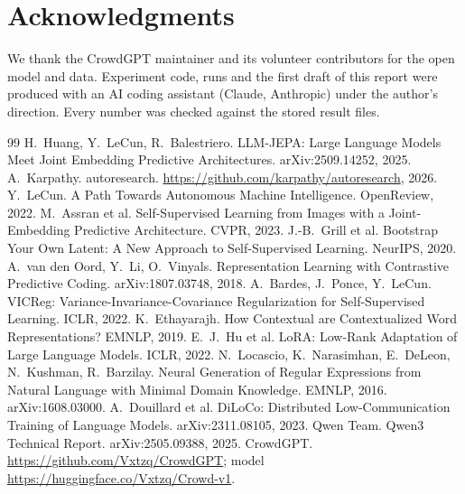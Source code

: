 \documentclass[11pt]{article}
\begin{document}
\section*{Acknowledgments}
We thank the CrowdGPT maintainer and its volunteer contributors for the open model and data. Experiment code, runs and
the first draft of this report were produced with an AI coding assistant (Claude, Anthropic) under the author's
direction. Every number was checked against the stored result files.

\begin{thebibliography}{99}
 H.~Huang, Y.~LeCun, R.~Balestriero. LLM-JEPA: Large Language Models Meet Joint Embedding
Predictive Architectures. arXiv:2509.14252, 2025.
 A.~Karpathy. autoresearch. \url{https://github.com/karpathy/autoresearch}, 2026.
 Y.~LeCun. A Path Towards Autonomous Machine Intelligence. OpenReview, 2022.
 M.~Assran et al. Self-Supervised Learning from Images with a Joint-Embedding Predictive
Architecture. CVPR, 2023.
 J.-B.~Grill et al. Bootstrap Your Own Latent: A New Approach to Self-Supervised Learning.
NeurIPS, 2020.
 A.~van den Oord, Y.~Li, O.~Vinyals. Representation Learning with Contrastive Predictive Coding.
arXiv:1807.03748, 2018.
 A.~Bardes, J.~Ponce, Y.~LeCun. VICReg: Variance-Invariance-Covariance Regularization for
Self-Supervised Learning. ICLR, 2022.
 K.~Ethayarajh. How Contextual are Contextualized Word Representations? EMNLP, 2019.
 E.~J.~Hu et al. LoRA: Low-Rank Adaptation of Large Language Models. ICLR, 2022.
 N.~Locascio, K.~Narasimhan, E.~DeLeon, N.~Kushman, R.~Barzilay. Neural Generation of Regular
Expressions from Natural Language with Minimal Domain Knowledge. EMNLP, 2016. arXiv:1608.03000.
 A.~Douillard et al. DiLoCo: Distributed Low-Communication Training of Language Models.
arXiv:2311.08105, 2023.
 Qwen Team. Qwen3 Technical Report. arXiv:2505.09388, 2025.
 CrowdGPT. \url{https://github.com/Vxtzq/CrowdGPT}; model \url{https://huggingface.co/Vxtzq/Crowd-v1}.
\end{thebibliography}
\end{document}
